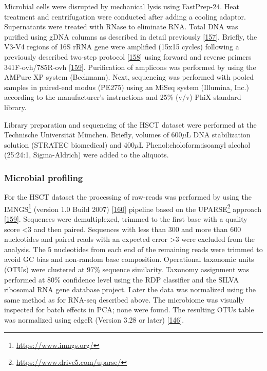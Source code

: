 \documentclass[
  a4paper,
]{book}
\DeclareRobustCommand{\href}[2]{#2\footnote{\url{#1}}}
\begin{document}
Microbial cells were disrupted by mechanical lysis using FastPrep-24.
Heat treatment and centrifugation were conducted after adding a cooling adaptor.
Supernatants were treated with RNase to eliminate RNA.
Total DNA was purified using gDNA columns as described in detail previously {[}\protect\hyperlink{ref-berry2011}{157}{]}.
Briefly, the V3-V4 regions of 16S rRNA gene were amplified (15x15 cycles) following a previously described two-step protocol {[}\protect\hyperlink{ref-klindworth2013}{158}{]} using forward and reverse primers 341F-ovh/785R-ovh {[}\protect\hyperlink{ref-edgar2013}{159}{]}.
Purification of amplicons was performed by using the AMPure XP system (Beckmann).
Next, sequencing was performed with pooled samples in paired-end modus (PE275) using an MiSeq system (Illumina, Inc.) according to the manufacturer's instructions and 25\% (v/v) PhiX standard library.

Library preparation and sequencing of the HSCT dataset were performed at the Technische Universität München.
Briefly, volumes of 600\(\mu\)L DNA stabilization solution (STRATEC biomedical) and 400\(\mu\)L Phenol:choloform:isoamyl alcohol (25:24:1, Sigma-Aldrich) were added to the aliquots.

\hypertarget{microbial-profiling}{%
\subsubsection{Microbial profiling}\label{microbial-profiling}}

For the HSCT dataset the processing of raw-reads was performed by using the \href{https://www.imngs.org/}{IMNGS} (version 1.0 Build 2007) {[}\protect\hyperlink{ref-lagkouvardos2016}{160}{]} pipeline based on the \href{https://www.drive5.com/uparse/}{UPARSE} approach {[}\protect\hyperlink{ref-edgar2013}{159}{]}.
Sequences were demultiplexed, trimmed to the first base with a quality score \textless3 and then paired.
Sequences with less than 300 and more than 600 nucleotides and paired reads with an expected error \textgreater3 were excluded from the analysis.
The 5 nucleotides from each end of the remaining reads were trimmed to avoid GC bias and non-random base composition.
Operational taxonomic units (OTUs) were clustered at 97\% sequence similarity.
Taxonomy assignment was performed at 80\% confidence level using the RDP classifier and the SILVA ribosomal RNA gene database project.
Later the data was normalized using the same method as for RNA-seq described above.
The microbiome was visually inspected for batch effects in PCA; none were found.
The resulting OTUs table was normalized using edgeR (Version 3.28 or later) {[}\protect\hyperlink{ref-mccarthy2012}{146}{]}.
\end{document}
